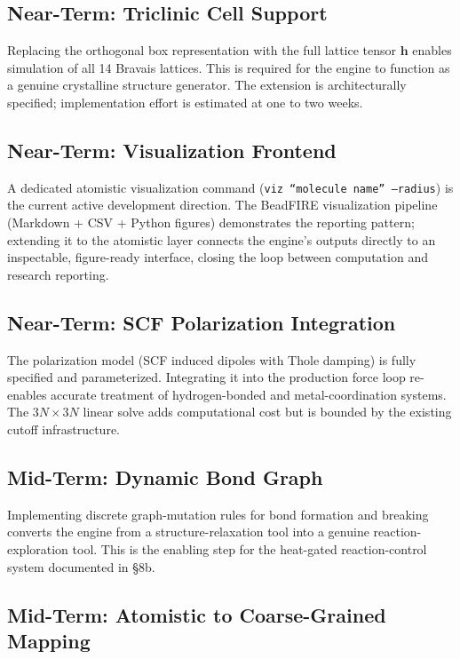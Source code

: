 \documentclass[11pt]{article}
\begin{document}
\subsection{Near-Term: Triclinic Cell Support}

Replacing the orthogonal box representation with the full
lattice tensor $\mathbf{h}$ enables simulation of all
14 Bravais lattices.  This is required for the engine to
function as a genuine crystalline structure generator.
The extension is architecturally specified; implementation
effort is estimated at one to two weeks.

\subsection{Near-Term: Visualization Frontend}

A dedicated atomistic visualization command
(\texttt{viz ``molecule name'' --radius}) is the current
active development direction.  The BeadFIRE visualization
pipeline (Markdown + CSV + Python figures) demonstrates
the reporting pattern; extending it to the atomistic layer
connects the engine's outputs directly to an inspectable,
figure-ready interface, closing the loop between computation
and research reporting.

\subsection{Near-Term: SCF Polarization Integration}

The polarization model (SCF induced dipoles with Thole damping)
is fully specified and parameterized.  Integrating it into the
production force loop re-enables accurate treatment of
hydrogen-bonded and metal-coordination systems.  The $3N \times 3N$
linear solve adds computational cost but is bounded by the
existing cutoff infrastructure.

\subsection{Mid-Term: Dynamic Bond Graph}

Implementing discrete graph-mutation rules for bond
formation and breaking converts the engine from a
structure-relaxation tool into a genuine reaction-exploration
tool.  This is the enabling step for the heat-gated
reaction-control system documented in \S8b.

\subsection{Mid-Term: Atomistic to Coarse-Grained Mapping}
\end{document}

